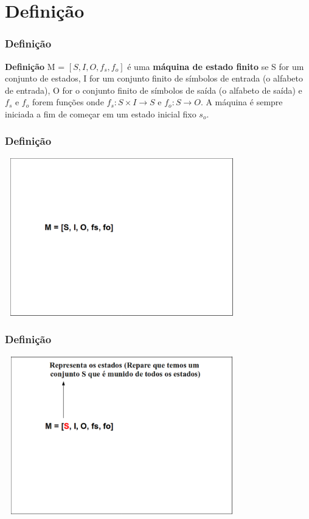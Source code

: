 \documentclass{beamer}
\begin{document}
\section{Definição}
  \begin{frame}
   \frametitle{Definição}
       \begin{block}{\textbf{Definição}}
	  M = $[S, I, O, f_s, f_o]$ é uma \textbf{máquina de estado finito} se S for um conjunto de estados, I for um conjunto finito de símbolos de entrada (o 
	  alfabeto de entrada), O for o conjunto finito de símbolos de saída (o alfabeto de saída) e $f_s$ e $f_o$ forem funções onde $f_s: S\times I \xrightarrow{} S$ e 
	  $f_o: S \xrightarrow{} O$. A máquina é sempre iniciada a fim de começar em um estado inicial fixo $s_o$. 
      \end{block}
  \end{frame}

  \begin{frame}
   \frametitle{Definição}
       \includegraphics[height=2.7in, width=4in]{entendendo_definicao_1.png}
  \end{frame}

  \begin{frame}
   \frametitle{Definição}
       \includegraphics[height=2.7in, width=4in]{entendendo_definicao_2.png}
  \end{frame}
\end{document}
